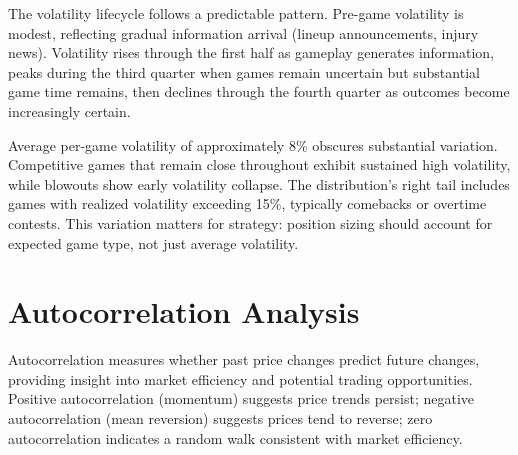 The volatility lifecycle follows a predictable pattern. Pre-game volatility is modest, reflecting gradual information arrival (lineup announcements, injury news). Volatility rises through the first half as gameplay generates information, peaks during the third quarter when games remain uncertain but substantial game time remains, then declines through the fourth quarter as outcomes become increasingly certain.

Average per-game volatility of approximately 8\% obscures substantial variation. Competitive games that remain close throughout exhibit sustained high volatility, while blowouts show early volatility collapse. The distribution's right tail includes games with realized volatility exceeding 15\%, typically comebacks or overtime contests. This variation matters for strategy: position sizing should account for expected game type, not just average volatility.

\section{Autocorrelation Analysis}

Autocorrelation measures whether past price changes predict future changes, providing insight into market efficiency and potential trading opportunities. Positive autocorrelation (momentum) suggests price trends persist; negative autocorrelation (mean reversion) suggests prices tend to reverse; zero autocorrelation indicates a random walk consistent with market efficiency.

